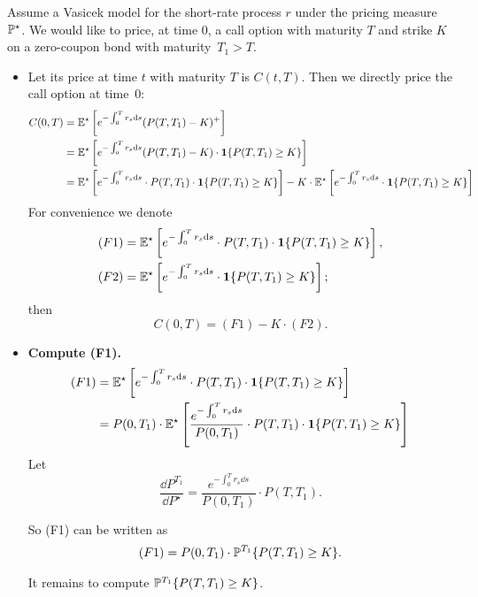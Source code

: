 \begin{example} Assume a Vasicek model for the short-rate process $r$ under the pricing measure $\mathbb{P}^\star$. We would like to price, at time $0$, a call option with
	maturity $T$ and strike $K$ on a zero-coupon bond with maturity~$T_1 > T$.  
		\begin{itemize}
			\item Let its price at time $t$ with maturity $T$ is $C(t,T)$. Then we directly price the call option at time~$0$:
			\begin{align*}
			C(0,T) &= \mathbb{E}^\star \left[  e^{ -\int^T_0 r_s \mathrm{d} s } ( P(T,T_1) - K  )^+  \right] \\
			&= \mathbb{E}^\star \left[  e^{ -\int^T_0 r_s \mathrm{d} s } ( P(T,T_1)  - K  )\cdot \boldsymbol{1}\{ P(T,T_1) \geq K \} \right]  \\
			&= \mathbb{E}^\star \left[  e^{ -\int^T_0 r_s \mathrm{d} s } \cdot P(T,T_1)  \cdot \boldsymbol{1}\{ P(T,T_1) \geq K \} \right] - K\cdot \mathbb{E}^\star \left[  e^{ -\int^T_0 r_s \mathrm{d} s } \cdot \boldsymbol{1}\{ P(T,T_1) \geq K \} \right]
			\end{align*}
			For convenience we denote 
			\begin{align*}
			(F1) &= \mathbb{E}^\star \left[  e^{ -\int^T_0 r_s \mathrm{d} s } \cdot P(T,T_1)  \cdot \boldsymbol{1}\{ P(T,T_1) \geq K \} \right],   \\
			(F2) &= \mathbb{E}^\star \left[  e^{ -\int^T_0 r_s \mathrm{d} s } \cdot \boldsymbol{1}\{ P(T,T_1) \geq K \} \right];
			\end{align*}
			then
			$$C(0,T) = (F1) - K \cdot (F2).$$ 
			\item \textbf{Compute (F1).}
			\begin{align*}
			(F1) &= \mathbb{E}^\star \left[  e^{ -\int^T_0 r_s \mathrm{d} s } \cdot P(T,T_1)  \cdot \boldsymbol{1}\{ P(T,T_1) \geq K \} \right]   \\
			&= P(0,T_1) \cdot \mathbb{E}^\star \left[  \frac{e^{ -\int^T_0 r_s \mathrm{d} s }}{P(0,T_1)} \cdot P(T,T_1)  \cdot \boldsymbol{1}\{ P(T,T_1) \geq K \} \right]   \\
			\end{align*}
			Let $$\frac{ \dd P^{T_1} }{ \dd P^\star } =  \frac{e^{ -\int^T_0 r_s \dd s }}{P(0,T_1)} \cdot P(T,T_1) .$$
			
			So (F1) can be written as
			\begin{align*}
			(F1) = P(0,T_1) \cdot \mathbb{P}^{T_1}   \{ P(T,T_1) \geq K   \}  . 
			\end{align*}
			
			It remains to compute $\mathbb{P}^{T_1}   \{ P(T,T_1) \geq K   \} $. 
			

\end{itemize}
\end{example}
